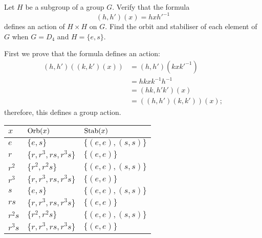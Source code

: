 \setcounter{question}{36}
\question
Let $H$ be a subgroup of a group $G$.
Verify that the formula
\[
    (h,h')(x) = hxh'^{-1}
\]
defines an action of $H \times H$ on $G$.
Find the orbit and stabiliser of each element of $G$
when $G = D_4$ and $H = \{e, s\}$.
\begin{solution}
    First we prove that the formula defines an action:
    \begin{align*}
        (h, h')((k,k')(x))
        &= (h,h')(kxk'^{-1}) \\
        &= hkxk^{-1}h^{-1} \\
        &= (hk,h'k')(x) \\
        &= ((h,h')(k,k'))(x);
    \end{align*}
    therefore, this defines a group action.
    \begin{center}
        \begin{tabular}{lll}
            \toprule
            $x$ & $\operatorname{Orb}(x)$ & $\operatorname{Stab}(x)$ \\
            \midrule
            $e$ & $\{e,s\}$ & $\{(e,e),(s,s)\}$ \\
            $r$ & $\{r,r^3,rs,r^3s\}$ & $\{(e,e)\}$ \\
            $r^2$ & $\{r^2,r^2s\}$ & $\{(e,e),(s,s)\}$ \\
            $r^3$ & $\{r,r^3,rs,r^3s\}$ & $\{(e,e)\}$ \\
            $s$ & $\{e,s\}$ & $\{(e,e),(s,s)\}$ \\
            $rs$ & $\{r,r^3,rs,r^3s\}$ & $\{(e,e)\}$ \\
            $r^2s$ & $\{r^2,r^2s\}$ & $\{(e,e),(s,s)\}$ \\
            $r^3s$ & $\{r,r^3,rs,r^3s\}$ & $\{(e,e)\}$ \\
            \bottomrule
        \end{tabular}
    \end{center}
\end{solution}

